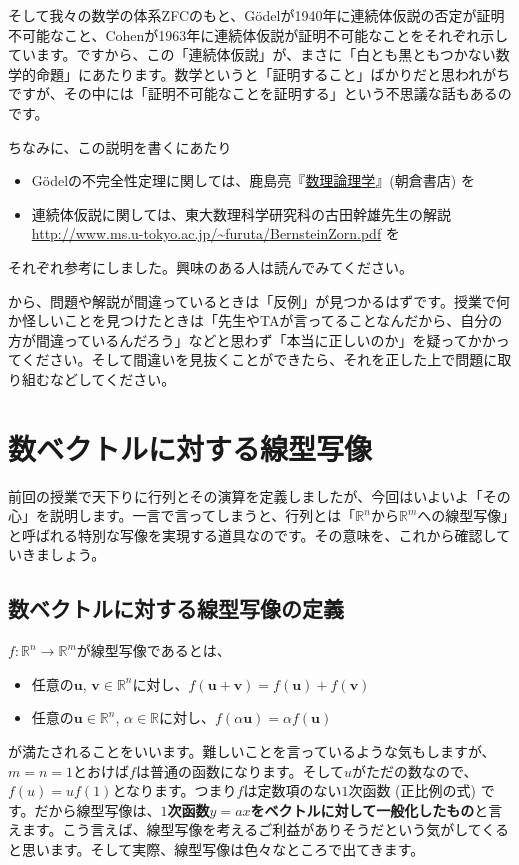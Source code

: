 {そして我々の数学の体系ZFCのもと、G\"odelが1940年に連続体仮説の否定が証明不可能なこと、Cohenが1963年に連続体仮説が証明不可能なことをそれぞれ示しています。ですから、この「連続体仮説」が、まさに「白とも黒ともつかない数学的命題」にあたります。数学というと「証明すること」ばかりだと思われがちですが、その中には「証明不可能なことを証明する」という不思議な話もあるのです。

ちなみに、この説明を書くにあたり
\begin{itemize}
\item G\"odelの不完全性定理に関しては、鹿島亮『\href{http://www.asakura.co.jp/G_12.php?isbn=ISBN978-4-254-11765-3}{数理論理学}』(朝倉書店) を
\item 連続体仮説に関しては、東大数理科学研究科の古田幹雄先生の解説 \url{http://www.ms.u-tokyo.ac.jp/~furuta/BernsteinZorn.pdf} を
\end{itemize}
それぞれ参考にしました。興味のある人は読んでみてください。
}から、問題や解説が間違っているときは「反例」が見つかるはずです。授業で何か怪しいことを見つけたときは「先生やTAが言ってることなんだから、自分の方が間違っているんだろう」などと思わず「本当に正しいのか」を疑ってかかってください。そして間違いを見抜くことができたら、それを正した上で問題に取り組むなどしてください。

\section{数ベクトルに対する線型写像}

前回の授業で天下りに行列とその演算を定義しましたが、今回はいよいよ「その心」を説明します。一言で言ってしまうと、行列とは「$\mathbb{R}^n$から$\mathbb{R}^m$への線型写像」と呼ばれる特別な写像を実現する道具なのです。その意味を、これから確認していきましょう。

\subsection{数ベクトルに対する線型写像の定義}

$f\colon\mathbb{R}^n \rightarrow \mathbb{R}^m$が線型写像であるとは、
\begin{itemize}
\item 任意の$\bm{u}$, $\bm{v}\in\mathbb{R}^n$に対し、$f(\bm{u} + \bm{v}) = f(\bm{u}) + f(\bm{v})$
\item 任意の$\bm{u}\in\mathbb{R}^n$, $\alpha\in\mathbb{R}$に対し、$f(\alpha\bm{u}) = \alpha f(\bm{u})$
\end{itemize}
が満たされることをいいます。難しいことを言っているような気もしますが、$m = n = 1$とおけば$f$は普通の函数になります。そして$u$がただの数なので、$f(u) = u f(1)$となります。つまり$f$は定数項のない$1$次函数 (正比例の式) です。だから線型写像は、\textbf{$1$次函数$y = ax$をベクトルに対して一般化したもの}と言えます。こう言えば、線型写像を考えるご利益がありそうだという気がしてくると思います。そして実際、線型写像は色々なところで出てきます。


